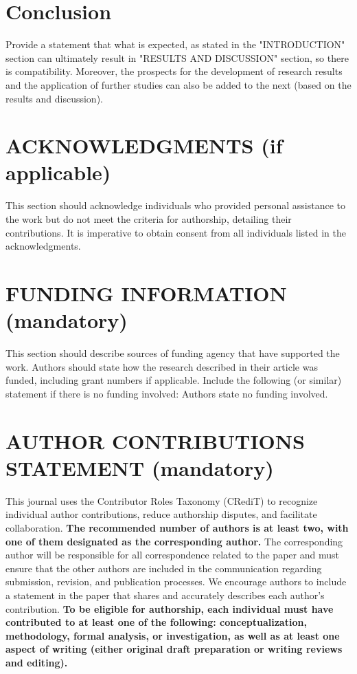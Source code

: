 \documentclass{iaesarticle}
\begin{document}
\section{Conclusion}
\label{}
Provide a statement that what is expected, as stated in the "INTRODUCTION" section can ultimately result in "RESULTS AND DISCUSSION" section, so there is compatibility. Moreover, the prospects for the development of research results and the application of further studies can also be added to the next (based on the results and discussion).

\section*{ACKNOWLEDGMENTS (if applicable)}
\label{}
This section should acknowledge individuals who provided personal assistance to the work but do not meet the criteria for authorship, detailing their contributions. It is imperative to obtain consent from all individuals listed in the acknowledgments.

\section*{FUNDING INFORMATION (mandatory)}
\label{}
This section should describe sources of funding agency that have supported the work. Authors should state how the research described in their article was funded, including grant numbers if applicable. Include the following (or similar) statement if there is no funding involved: Authors state no funding involved.

\section*{AUTHOR CONTRIBUTIONS STATEMENT (mandatory)}
\label{}
This journal uses the Contributor Roles Taxonomy (CRediT) to recognize individual author contributions, reduce authorship disputes, and facilitate collaboration. \textbf{The recommended number of authors is at least two, with one of them designated as the corresponding author.} The corresponding author will be responsible for all correspondence related to the paper and must ensure that the other authors are included in the communication regarding submission, revision, and publication processes. We encourage authors to include a statement in the paper that shares and accurately describes each author's contribution. \textbf{To be eligible for authorship, each individual must have contributed to at least one of the following: conceptualization, methodology, formal analysis, or investigation, as well as at least one aspect of writing (either original draft preparation or writing reviews and editing).}
\end{document}
